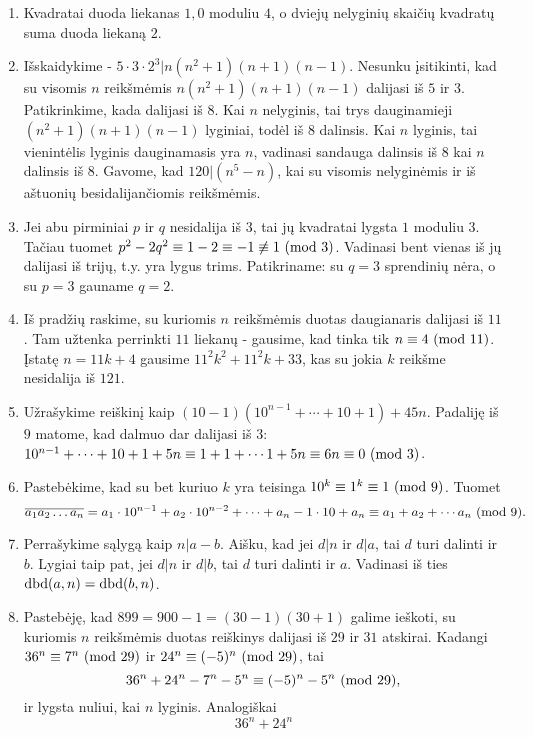 \begin{enumerate}
\item
    Kvadratai duoda liekanas $1,0$ moduliu $4$, o dviejų nelyginių skaičių
    kvadratų suma duoda liekaną $2$.
\item
    Išskaidykime - $5\cdot3\cdot2^3 | n(n^2+1)(n+1)(n-1)$. Nesunku
    įsitikinti, kad su visomis $n$ reikšmėmis $n(n^2+1)(n+1)(n-1)$
    dalijasi iš $5$ ir $3$. Patikrinkime, kada dalijasi iš $8$. Kai
    $n$ nelyginis, tai trys dauginamieji $(n^2+1)(n+1)(n-1)$ lyginiai,
    todėl iš $8$ dalinsis. Kai $n$ lyginis, tai vienintėlis lyginis
    dauginamasis yra $n$, vadinasi sandauga dalinsis iš $8$ kai $n$
    dalinsis iš $8$. Gavome, kad $120|(n^5-n)$, kai su visomis nelyginėmis
    ir iš aštuonių besidalijančiomis reikšmėmis.
\item
    Jei abu pirminiai $p$ ir $q$ nesidalija iš $3$, tai jų kvadratai
    lygsta $1$ moduliu $3$. Tačiau tuomet $p^2 - 2q^2 \equiv 1-2 \equiv -1
    \not \equiv 1\ (\text{mod } 3)$. Vadinasi bent vienas iš jų dalijasi iš trijų,
    t.y. yra lygus trims. Patikriname: su $q=3$ sprendinių nėra, o su  
    $p=3$ gauname $q=2$.
\item
    Iš pradžių raskime, su kuriomis $n$ reikšmėmis duotas daugianaris
    dalijasi iš $11$. Tam užtenka perrinkti $11$ liekanų - gausime, kad
    tinka tik $n\equiv 4 \ (\text{mod } 11)$. Įstatę $n = 11k + 4$ gausime $11^2 k^2 +
    11^2k + 33$, kas su jokia $k$ reikšme nesidalija iš $121$.
\item
    Užrašykime reiškinį kaip $(10 - 1)(10^{n-1} + \cdots + 10 + 1) + 45n$.
    Padaliję iš $9$ matome, kad dalmuo dar dalijasi iš $3$:
    $10^{n-1} + \cdots + 10 + 1 + 5n \equiv 1 + 1 + \cdots 1 + 5n \equiv
    6n \equiv 0 \ (\text{mod } 3)$.
\item
    Pastebėkime, kad su bet kuriuo $k$ yra teisinga $10^k \equiv 1^k
    \equiv 1\ (\text{mod } 9)$. Tuomet $$\overline{a_1a_2\dots a_n}=a_1\cdot 10^{n-1}
    + a_2\cdot 10^{n-2} + \cdots + a_n-1\cdot 10 + a_n \equiv a_1 + a_2 +
    \cdots a_n \ (\text{mod } 9).$$ 
\item
    Perrašykime sąlygą kaip $n|a-b$. Aišku, kad jei $d|n$ ir $d|a$, tai
    $d$ turi dalinti ir $b$. Lygiai taip pat, jei $d|n$ ir $d|b$, tai $d$
    turi dalinti ir $a$. Vadinasi iš ties $\operatorname{dbd}(a,n) = \operatorname{dbd}(b,n)$.
\item
    Pastebėję, kad $899 = 900 - 1 = (30-1)(30+1)$ galime ieškoti, su
    kuriomis $n$ reikšmėmis duotas reiškinys dalijasi iš $29$ ir $31$
    atskirai.  Kadangi $36^n \equiv 7^n \ (\text{mod } 29)$ ir $24^n \equiv
    (-5)^n\ (\text{mod } 29)$, tai $$36^n + 24^n - 7^n -5^n\equiv (-5)^n -5^n
    \ (\text{mod } 29),$$ ir lygsta nuliui, kai $n$ lyginis. Analogiškai $$36^n + 24^n
$$
\end{enumerate}
